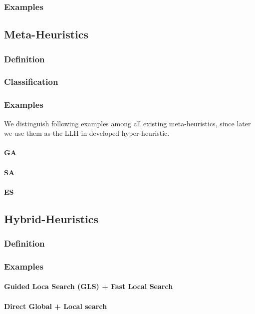 \subsubsection{Examples}

\subsection{Meta-Heuristics}
\subsubsection{Definition}
\subsubsection{Classification}
\subsubsection{Examples}
We distinguish following examples among all existing meta-heuristics, since later we use them as the LLH in developed hyper-heuristic.
\paragraph{GA}
\paragraph{SA}
\paragraph{ES}

\subsection{Hybrid-Heuristics}
\subsubsection{Definition}
\subsubsection{Examples}
\paragraph{Guided Loca Search (GLS) + Fast Local Search} \cite{tsang1997fast}
\paragraph{Direct Global + Local search} \cite{syrjakow1999efficient}
